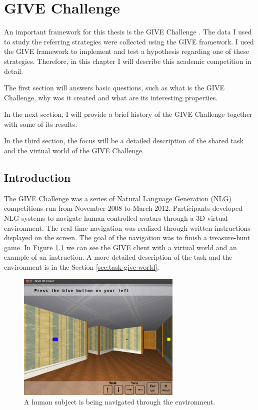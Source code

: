 \chapter{GIVE Challenge}
\label{chap:give-challenge}
An important framework for this thesis is the GIVE Challenge \citep{koller2010first}. The data I used to study the referring strategies were collected using the GIVE framework. I used the GIVE framework to implement and test a hypothesis regarding one of these strategies. Therefore, in this chapter I will describe this academic competition in detail.  

The first section will answers basic questions, such as what is the GIVE Challenge, why was it created and what are its interesting properties. 

In the next section, I will provide a brief history of the GIVE Challenge together with some of its results. 

In the third section, the focus will be a detailed description of the shared task and the virtual world of the GIVE Challenge.

\section{Introduction}
The GIVE Challenge was a series of Natural Language Generation (NLG) competitions run from November 2008 to March 2012. Participants developed NLG systems to navigate human-controlled avatars through a 3D virtual environment. The real-time navigation was realized through written instructions displayed on the screen. The goal of the navigation was to finish a treasure-hunt game. In Figure \ref{fig:give-client} we can see the GIVE client with a virtual world and an example of an instruction. A more detailed description of the task and the environment is in the Section \ref{sec:task-give-world}.

\begin{figure}[!htbp]
  \centering
	\includegraphics[width=0.7\textwidth]{Images/give-client}
	\caption{A human subject is being navigated through the environment.}
	\label{fig:give-client}
\end{figure}

